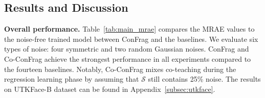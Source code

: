 \documentclass{article}
\theoremstyle{plain}
\theoremstyle{definition}
\theoremstyle{remark}
\begin{document}


\subsection{Results and Discussion}\label{sec:discussion}
\textbf{Overall performance.}
Table~\ref{tab:main_mrae} compares the MRAE values to 
the noise-free trained model between ConFrag and the baselines.
We evaluate six types of noise: four symmetric and two random Gaussian noises. 
ConFrag and Co-ConFrag achieve the strongest performance in all experiments compared to the fourteen baselines.
Notably, Co-ConFrag mixes co-teaching during the regression learning phase by assuming that $\mathcal{S}$ still contains 25\% noise.
The results on UTKFace-B dataset can be found in Appendix~\ref{subsec:utkface}.
\end{document}
